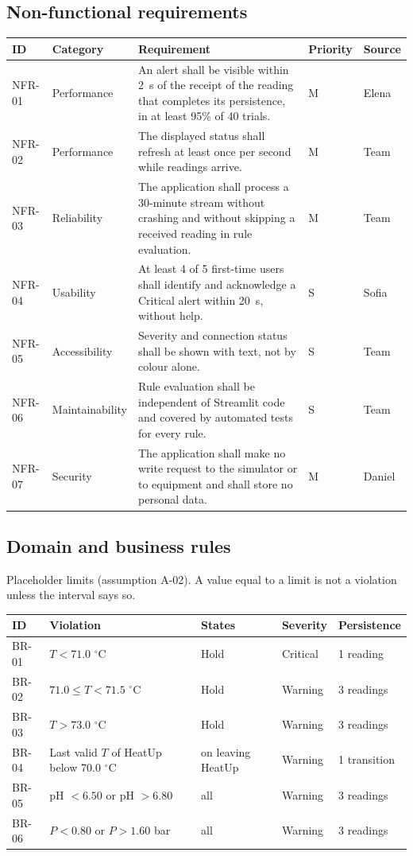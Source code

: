 \documentclass[10pt,a4paper]{article}
\newcommand{\head}[1]{\textbf{\color{courseblue}#1}}
\begin{document}
\subsection{Non-functional requirements}
\begin{longtable}{@{}L{14mm}L{24mm}L{79mm}L{14mm}L{17mm}@{}}
\toprule \head{ID} & \head{Category} & \head{Requirement} & \head{Priority} & \head{Source}\\ \midrule \endhead
NFR-01 & Performance & An alert shall be visible within 2~s of the receipt of the reading that completes its persistence, in at least 95\% of 40 trials. & M & Elena\\
NFR-02 & Performance & The displayed status shall refresh at least once per second while readings arrive. & M & Team\\
NFR-03 & Reliability & The application shall process a 30-minute stream without crashing and without skipping a received reading in rule evaluation. & M & Team\\
NFR-04 & Usability & At least 4 of 5 first-time users shall identify and acknowledge a Critical alert within 20~s, without help. & S & Sofia\\
NFR-05 & Accessibility & Severity and connection status shall be shown with text, not by colour alone. & S & Team\\
NFR-06 & Maintaina\-bility & Rule evaluation shall be independent of Streamlit code and covered by automated tests for every rule. & S & Team\\
NFR-07 & Security & The application shall make no write request to the simulator or to equipment and shall store no personal data. & M & Daniel\\
\bottomrule
\end{longtable}

\subsection{Domain and business rules}\label{sec:rules}
Placeholder limits (assumption A-02). A value equal to a limit is not a violation unless the interval says so.

\begin{longtable}{@{}L{15mm}L{58mm}L{25mm}L{19mm}L{30mm}@{}}
\toprule \head{ID} & \head{Violation} & \head{States} & \head{Severity} & \head{Persistence}\\ \midrule \endhead
BR-01 & $T < 71.0$ $^\circ$C & Hold & Critical & 1 reading\\
BR-02 & $71.0 \le T < 71.5$ $^\circ$C & Hold & Warning & 3 readings\\
BR-03 & $T > 73.0$ $^\circ$C & Hold & Warning & 3 readings\\
BR-04 & Last valid $T$ of HeatUp below 70.0 $^\circ$C & on leaving HeatUp & Warning & 1 transition\\
BR-05 & pH $< 6.50$ or pH $> 6.80$ & all & Warning & 3 readings\\
BR-06 & $P < 0.80$ or $P > 1.60$ bar & all & Warning & 3 readings\\
\bottomrule
\end{longtable}
\end{document}
